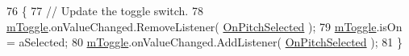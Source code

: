 \begin{DoxyCode}
76     \{
77         \textcolor{comment}{// Update the toggle switch.}
78         \hyperlink{group___s_c___p_s_t_priv_var_ga1ecd33f50c82f6ffda81850438907a31}{mToggle}.onValueChanged.RemoveListener( \hyperlink{group___s_c___p_s_t_handlers_ga5f4ea69eee3ed20cb09d56b7281ce861}{OnPitchSelected} );
79         \hyperlink{group___s_c___p_s_t_priv_var_ga1ecd33f50c82f6ffda81850438907a31}{mToggle}.isOn = aSelected;
80         \hyperlink{group___s_c___p_s_t_priv_var_ga1ecd33f50c82f6ffda81850438907a31}{mToggle}.onValueChanged.AddListener( \hyperlink{group___s_c___p_s_t_handlers_ga5f4ea69eee3ed20cb09d56b7281ce861}{OnPitchSelected} );
81     \}
\end{DoxyCode}
